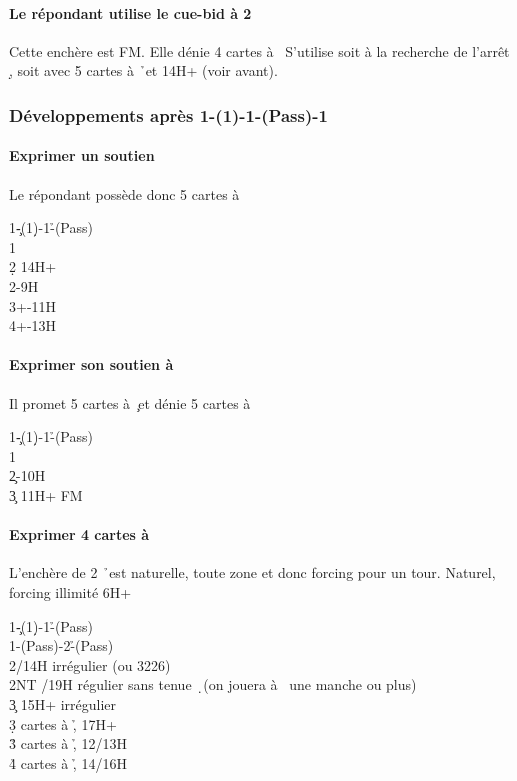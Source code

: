 \documentclass[a4paper]{article}
\begin{document}
\paragraph{Le répondant utilise le cue-bid à 2 \pdfd}

Cette enchère est FM. Elle dénie 4 cartes à \s\ 
S’utilise soit à la recherche de l’arrêt \d , soit avec 5 cartes à \h\ et 14H+ (voir avant).

\subsubsection{Développements après 1\pdfc-(1\pdfd)-1\pdfh-(Pass)-1\pdfs}

\paragraph{Exprimer un soutien \pdfs}

Le répondant possède donc 5 cartes à \s 

\begin{bidtable}
1\c-(1\d)-1\h-(Pass)\\
1\s\+\\
2\d \> 14H+\\
2\s {}-9H\\
3\s {}+-11H\\
4\s {}+-13H\-
\end{bidtable}

\paragraph{Exprimer son soutien à \pdfc}

Il promet 5 cartes à \c\ et dénie 5 cartes à \s 

\begin{bidtable}
1\c-(1\d)-1\h-(Pass)\\
1\s\+\\
2\c {}-10H\\
3\c \> 11H+ FM\-
\end{bidtable}

\paragraph{Exprimer 4 cartes à \pdfh}

L’enchère de 2 \h\ est naturelle, toute zone et donc forcing pour un tour.
Naturel, forcing illimité 6H+

\begin{bidtable}
1\c-(1\d)-1\h-(Pass)\\
1\s-(Pass)-2\h-(Pass)\\
2\s {}/14H irrégulier (ou 3226)\\
2NT /19H régulier sans tenue \d\ (on jouera à \s\ une manche ou plus)\\
3\c \> 15H+ irrégulier\\
3\d {} cartes à \h , 17H+\\
3\h {} cartes à \h , 12/13H\\
4\h \> 4 cartes à \h , 14/16H
\end{bidtable}
\end{document}
